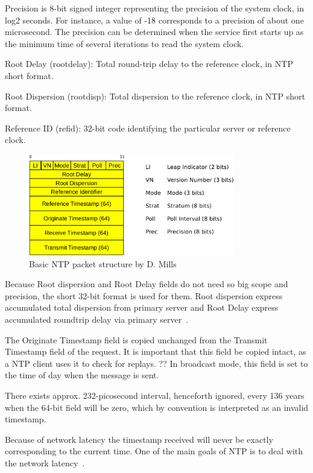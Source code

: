 Precision is 8-bit signed integer representing the precision of the
system clock, in log2 seconds.
For instance, a value of -18
corresponds to a precision of about one microsecond. %
The precision
can be determined when the service first starts up as the minimum
time of several iterations to read the system clock.
   
   
   
   Root Delay (rootdelay): Total round-trip delay to the reference
   clock, in NTP short format.

   Root Dispersion (rootdisp): Total dispersion to the reference clock,
   in NTP short format.

Reference ID (refid): 32-bit code identifying the particular server or reference clock.

\begin{figure}
	\centering
	\includegraphics[width=9cm,keepaspectratio]{fig/ntp-packet.pdf}
	\caption{Basic NTP packet structure by D. Mills}
	\label{fig:ntp-packet}
	\bigskip
\end{figure}

Because Root dispersion and Root Delay fields do not need so big scope and precision,
the short 32-bit format is used for them.
Root dispersion express accumulated total dispersion from primary server
and Root Delay express accumulated roundtrip delay via primary server~\cite{ntp-arch}.

The Originate Timestamp field is copied
   unchanged from the Transmit Timestamp field of the request. It is
   important that this field be copied intact, as a NTP client uses it
   to check for replays.
  ?? In broadcast mode, this field is set to the
   time of day when the message is sent.
%

There exists approx. 232-picosecond interval, henceforth ignored, every 136 years when
the 64-bit field will be zero, which by convention is interpreted as an invalid timestamp.

Because of network latency the timestamp received will never be exactly corresponding to
the current time.
One of the main goals of NTP is to deal with the network latency~\cite{ntp-overview}.
